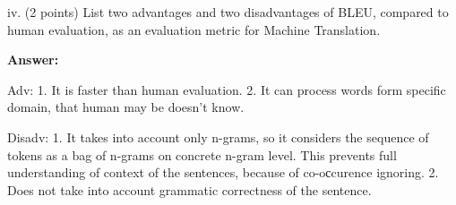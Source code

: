 \documentclass{article}
\begin{document}
	
	iv. (2 points) List two advantages and two disadvantages of BLEU, compared to human evaluation, as an evaluation metric for Machine Translation.

	\smallbreak
	\textbf{Answer:}
	
	Adv:
	1. It is faster than human evaluation.
	2. It can process words form specific domain, that human may be doesn’t know.
	
	Disadv:
	1. It takes into account only n-grams, so it considers the sequence of tokens as a bag of n-grams on concrete n-gram level. This prevents full understanding of context of the sentences, because of co-oсcurence ignoring.
	2. Does not take into account grammatic correctness of the sentence.
\end{document}

